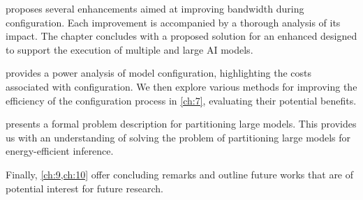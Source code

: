  proposes several \confignoc{} enhancements aimed at improving bandwidth during configuration.
Each improvement is accompanied by a thorough analysis of its impact.
The chapter concludes with a proposed solution for an enhanced \confignoc{} designed to support the execution of multiple and large AI models.

 provides a power analysis of model configuration, highlighting the costs associated with configuration. 
We then explore various methods for improving the efficiency of the configuration process in \cref{ch:7}, evaluating their potential benefits.

 presents a formal problem description for partitioning large models.
This provides us with an understanding of solving the problem of partitioning large models for energy-efficient inference.

Finally, \cref{ch:9,ch:10} offer concluding remarks and outline future works that are of potential interest for future research.




